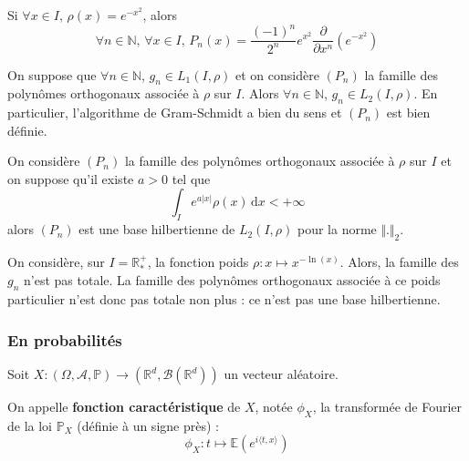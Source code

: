	\begin{example}
		Si $\forall x \in I, \, \rho(x) = e^{-x^2}$, alors
		\[ \forall n \in \mathbb{N}, \, \forall x \in I, \, P_n(x) = \frac{(-1)^n}{2^n} e^{x^2} \frac{\partial}{\partial x^n} \left( e^{-x^2} \right) \]
	\end{example}


	\begin{lemma}
		On suppose que $\forall n \in \mathbb{N}$, $g_n \in L_1(I, \rho)$ et on considère $(P_n)$ la famille des polynômes orthogonaux associée à $\rho$ sur $I$. Alors $\forall n \in \mathbb{N}$, $g_n \in L_2(I, \rho)$. En particulier, l'algorithme de Gram-Schmidt a bien du sens et $(P_n)$ est bien définie.
	\end{lemma}


	\begin{application}
		On considère $(P_n)$ la famille des polynômes orthogonaux associée à $\rho$ sur $I$ et on suppose qu'il existe $a > 0$ tel que
		\[ \int_I e^{a \vert x \vert} \rho(x) \, \mathrm{d}x < +\infty \]
		alors $(P_n)$ est une base hilbertienne de $L_2(I, \rho)$ pour la norme $\Vert . \Vert_2$.
	\end{application}

	\begin{cexample}
		On considère, sur $I = \mathbb{R}^+_*$, la fonction poids $\rho : x \mapsto x^{-\ln(x)}$. Alors, la famille des $g_n$ n'est pas totale. La famille des polynômes orthogonaux associée à ce poids particulier n'est donc pas totale non plus : ce n'est pas une base hilbertienne.
	\end{cexample}

	\subsubsection{En probabilités}


	Soit $X : (\Omega, \mathcal{A}, \mathbb{P}) \rightarrow (\mathbb{R}^d, \mathcal{B}(\mathbb{R}^d))$ un vecteur aléatoire.

	\begin{definition}
		On appelle \textbf{fonction caractéristique} de $X$, notée $\phi_X$, la transformée de Fourier de la loi $\mathbb{P}_X$ (définie à un signe près) :
		\[ \phi_X : t \mapsto \mathbb{E}(e^{i \langle t, x \rangle}) \]
	\end{definition}

